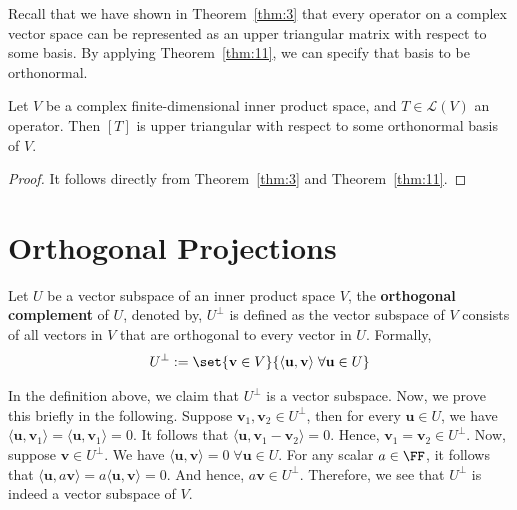 \documentclass[thmcnt=section, color=blue, 12pt]{my-elegantbook}
\begin{document}

Recall that we have shown in Theorem~\ref{thm:3} that every operator 
on a complex vector space can be represented as an upper triangular matrix
with respect to some basis. 
By applying Theorem~\ref{thm:11}, 
we can specify that basis to be orthonormal.

\begin{corollary} \label{cor:6}
    Let $V$ be a complex finite-dimensional inner product space, 
	and $T \in \mathcal{L}(V)$ an operator. 
	Then $[T]$ is upper triangular with respect to 
	some orthonormal basis of $V$.
\end{corollary}

\begin{proof}
    It follows directly from Theorem~\ref{thm:3} and Theorem~\ref{thm:11}.
\end{proof}


\section{Orthogonal Projections}


\begin{definition} \label{def:2}
	Let $U$ be a vector subspace of an inner product space $V$,
	the \textbf{orthogonal complement}
	of $U$, denoted by, $U^\perp$ is defined as the 
	vector subspace of $V$ consists of 
	all vectors in $V$ that are orthogonal to every vector in $U$.
	Formally,
	\begin{align*}
		U^\perp := \set{\mathbf{v} \in V}{\langle \mathbf{u}, \mathbf{v} \rangle \; \forall \mathbf{u} \in U}
	\end{align*}
\end{definition}

In the definition above, we claim that $U^\perp$
is a vector subspace.
Now, we prove this briefly in the following.
Suppose $\mathbf{v}_1, \mathbf{v}_2 \in U^\perp$,
then for every $\mathbf{u} \in U$,
we have $\langle \mathbf{u}, \mathbf{v}_1 \rangle = \langle \mathbf{u}, \mathbf{v}_1 \rangle = 0$.
It follows that $\langle \mathbf{u}, \mathbf{v}_1 - \mathbf{v}_2 \rangle = 0$.
Hence, $\mathbf{v}_1 = \mathbf{v}_2 \in U^\perp$.
Now, suppose $\mathbf{v} \in U^\perp$.
We have $\langle \mathbf{u}, \mathbf{v} \rangle = 0 \; \forall \mathbf{u} \in U$. 
For any scalar $a \in \FF$, it follows 
that $\langle \mathbf{u}, a \mathbf{v} \rangle = a \langle \mathbf{u},  \mathbf{v} \rangle = 0$.
And hence, $a \mathbf{v} \in U^\perp$.
Therefore, we see that $U^\perp$ is indeed a vector subspace of $V$.
\end{document}

